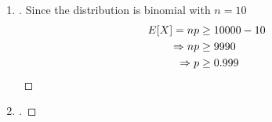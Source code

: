 \documentclass[paper=usletter, fontsize=12pt]{article}
\begin{document}
\begin{enumerate}
\begin{proof}[\unskip\nopunct]
\begin{enumerate}
            \end{enumerate}
        \end{proof}
        \vspace{0.2in}

        \item
        \begin{proof}[\unskip\nopunct]
            Since the distribution is binomial with $n=10$
            \begin{align*}
                E[X] = np & \ge 10000-10\\
                \Rightarrow np & \ge 9990\\
                \Rightarrow p & \ge 0.999 \qedhere
            \end{align*}
        \end{proof}
        \vspace{0.2in}

        \item
        \begin{proof}[\unskip\nopunct]
        \end{proof}
        \vspace{0.2in}

    \end{enumerate}
\end{document}
